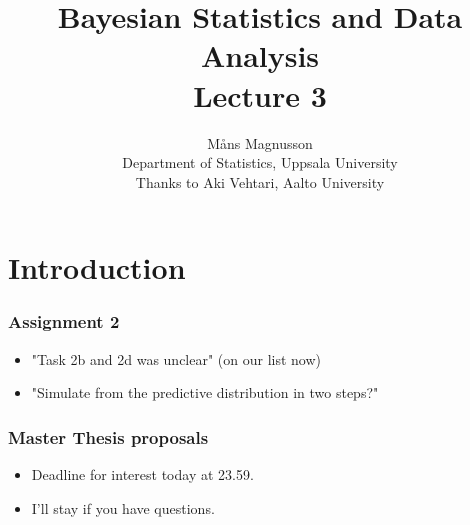 \documentclass[10pt]{beamer}
\title[]{{\color{black}Bayesian Statistics and Data Analysis \\ Lecture 3}}
\author[]{M{\aa}ns Magnusson \\ Department of Statistics, Uppsala University \\ Thanks to Aki Vehtari, Aalto University}
\date{}
\begin{document}
\frame{\titlepage
}



\section{Introduction}

\begin{frame}
  \frametitle{Assignment 2}

  \begin{itemize}
  \item "Task 2b and 2d was  unclear" (on our list now)\pause
  \item "Simulate from the predictive distribution in two steps?"\pause
  \end{itemize}

\end{frame}

\begin{frame}
  \frametitle{Master Thesis proposals}

  \begin{itemize}
  \item Deadline for interest today at 23.59.
  \item I'll stay if you have questions.
  \end{itemize}

\end{frame}
\end{document}
